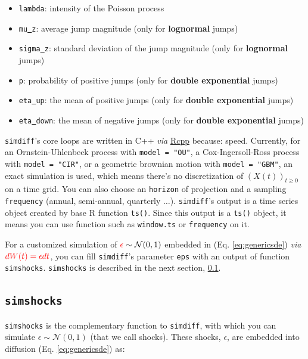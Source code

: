 \documentclass[a4paper]{article}\usepackage[]{graphicx}\usepackage[]{color}
\newcommand{\proglang}[1]{\textsf{#1}}
\newcommand{\code}[1]{\mbox{\texttt{#1}}}
\newcommand{\MN}{\mathcal{N}}
\begin{document}
\begin{itemize}
\item \code{lambda}: intensity of the Poisson process
\item \code{mu\underline{ }z}: average jump magnitude (only for {\bf lognormal} jumps)
\item \code{sigma\underline{ }z}: standard deviation of the jump magnitude (only for {\bf lognormal} jumps)
\item \code{p}: probability of positive jumps (only for {\bf double exponential} jumps)
\item \code{eta\underline{ }up}: the mean of positive jumps (only for {\bf double exponential} jumps)
\item \code{eta\underline{ }down}: the mean of negative jumps (only for {\bf double exponential} jumps)
\end{itemize}

\medskip

\code{simdiff}'s core loops are written in C++ \textit{via} \href{http://cran.r-project.org/web/packages/Rcpp/index.html}{Rcpp} because: speed.  Currently, for an Ornstein-Uhlenbeck process with \code{model = "OU"}, a Cox-Ingersoll-Ross process with \code{model = "CIR"}, or a geometric brownian motion with \code{model = "GBM"}, an exact simulation is used, which means there's no discretization of $(X(t))_{t \geq 0}$ on a time grid. You can also choose an \code{horizon} of projection and a sampling \code{frequency} (annual, semi-annual, quarterly $\ldots$). \code{simdiff}'s output is a time series object created by base \proglang{R} function \code{ts()}. Since this output is a \code{ts()} object, it means you can use function such as \code{window.ts} or \code{frequency} on it. 

\medskip

For a customized simulation of $\textcolor{red}{\epsilon} \sim \MN(0, 1)$ embedded in (Eq. \ref{eq:genericsde}) \textit{via} $\textcolor{red}{dW(t) = \epsilon dt}$, you can fill \code{simdiff}'s parameter \code{eps} with an output of function \code{simshocks}. \code{simshocks} is described in the next section, \ref{sec:simshocks}.


\subsection{\code{simshocks}}
\label{sec:simshocks}

\code{simshocks} is the complementary function to \code{simdiff}, with which you can simulate  $\epsilon \sim \MN(0, 1)$ (that we call shocks). These shocks, $\epsilon$, are embedded into diffusion (Eq. \ref{eq:genericsde}) as:
\end{document}
